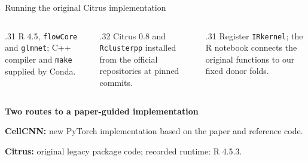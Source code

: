 \documentclass[aspectratio=169,10pt]{beamer}
\newcommand{\eyebrow}[1]{{\color{Teal}\bfseries #1}\par\smallskip}
\begin{document}
\begin{frame}{Running the original Citrus implementation}
  \begin{center}
  \end{center}
  \begin{columns}[T,onlytextwidth]
    \begin{column}{.31\textwidth}
      \small R 4.5, \texttt{flowCore} and \texttt{glmnet}; C++ compiler and \texttt{make} supplied by Conda.
    \end{column}
    \begin{column}{.32\textwidth}
      \small Citrus 0.8 and \texttt{Rclusterpp} installed from the official repositories at pinned commits.
    \end{column}
    \begin{column}{.31\textwidth}
      \small Register \texttt{IRkernel}; the R notebook connects the original functions to our fixed donor folds.
    \end{column}
  \end{columns}
  \bigskip
  \eyebrow{Two routes to a paper-guided implementation}
  \small\textbf{CellCNN:} new PyTorch implementation based on the paper and reference code.\par
  \textbf{Citrus:} original legacy package code; recorded runtime: R 4.5.3.
\end{frame}
\end{document}
